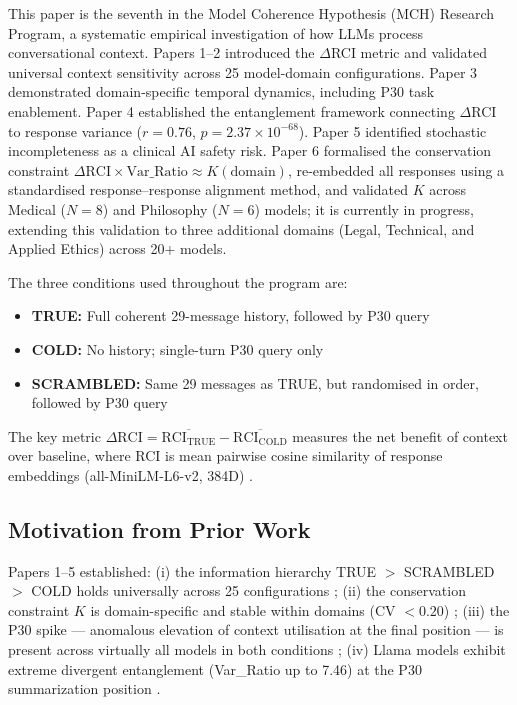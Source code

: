 \documentclass[11pt,a4paper]{article}
\begin{document}
This paper is the seventh in the Model Coherence Hypothesis (MCH) Research Program, a systematic empirical investigation of how LLMs process conversational context. Papers 1--2 \citep{laxman2026paper1, laxman2026paper2} introduced the $\Delta$RCI metric and validated universal context sensitivity across 25 model-domain configurations. Paper 3 \citep{laxman2026paper3} demonstrated domain-specific temporal dynamics, including P30 task enablement. Paper 4 \citep{laxman2026paper4} established the entanglement framework connecting $\Delta$RCI to response variance ($r = 0.76$, $p = 2.37 \times 10^{-68}$). Paper 5 \citep{laxman2026paper5} identified stochastic incompleteness as a clinical AI safety risk. Paper 6 \citep{laxman2026paper6} formalised the conservation constraint $\Delta\text{RCI} \times \text{Var\_Ratio} \approx K(\text{domain})$, re-embedded all responses using a standardised response--response alignment method, and validated $K$ across Medical ($N = 8$) and Philosophy ($N = 6$) models; it is currently in progress, extending this validation to three additional domains (Legal, Technical, and Applied Ethics) across 20+ models.

The three conditions used throughout the program are:
\begin{itemize}
    \item \textbf{TRUE:} Full coherent 29-message history, followed by P30 query
    \item \textbf{COLD:} No history; single-turn P30 query only
    \item \textbf{SCRAMBLED:} Same 29 messages as TRUE, but randomised in order, followed by P30 query
\end{itemize}

The key metric $\Delta\text{RCI} = \overline{\text{RCI}_\text{TRUE}} - \overline{\text{RCI}_\text{COLD}}$ measures the net benefit of context over baseline, where RCI is mean pairwise cosine similarity of response embeddings (all-MiniLM-L6-v2, 384D) \citep{reimers2019sentence}.

\subsection{Motivation from Prior Work}

Papers 1--5 established: (i) the information hierarchy TRUE $>$ SCRAMBLED $>$ COLD holds universally across 25 configurations \citep{laxman2026paper2}; (ii) the conservation constraint $K$ is domain-specific and stable within domains (CV $< 0.20$) \citep{laxman2026paper4, laxman2026paper5}; (iii) the P30 spike --- anomalous elevation of context utilisation at the final position --- is present across virtually all models in both conditions \citep{laxman2026paper3}; (iv) Llama models exhibit extreme divergent entanglement (Var\_Ratio up to 7.46) at the P30 summarization position \citep{laxman2026paper4, laxman2026paper5}.
\end{document}

